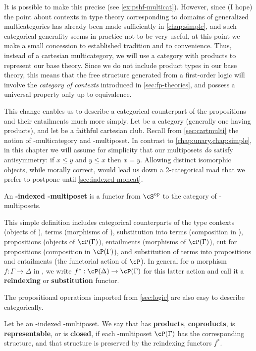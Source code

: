 It is possible to make this precise (see \cref{ex:pshf-multicat}).
However, since (I hope) the point about contexts in type theory corresponding to domains of generalized multicategories has already been made sufficiently in \cref{chap:simple}, and such categorical generality seems in practice not to be very useful, at this point we make a small concession to established tradition and to convenience.
Thus, instead of a cartesian multicategory, we will use a category with products to represent our base theory.
Since we do not include product types in our base theory, this means that the free structure generated from a first-order logic will involve the \emph{category of contexts} introduced in \cref{sec:fp-theories}, and possess a universal property only up to equivalence.

This change enables us to describe a categorical counterpart of the propositions and their entailments much more simply.
Let \cS be a category (generally one having products), and let \fS be a faithful cartesian club.
Recall from \cref{sec:cartmulti} the notion of \fS-multicategory and \fS-multiposet.
In contrast to \cref{chap:unary,chap:simple}, in this chapter we will assume for simplicity that our multiposets \emph{do} satisfy antisymmetry: if $x\le y$ and $y\le x$ then $x=y$.
Allowing distinct isomorphic objects, while morally correct, would lead us down a 2-categorical road that we prefer to postpone until \cref{sec:indexed-moncat}.

\begin{defn}
  An \textbf{\cS-indexed \fS-multiposet} is a functor \cP from $\cS\op$ to the category of \fS-multiposets.
\end{defn}

This simple definition includes categorical counterparts of the type contexts (objects of \cS), terms (morphisms of \cS), substitution into terms (composition in \cS), propositions (objects of $\cP(\Gamma)$), entailments (morphisms of $\cP(\Gamma)$), cut for propositions (composition in $\cP(\Gamma)$), and substitution of terms into propositions and entailments (the functorial action of $\cP$).
In general for a morphism $f:\Gamma\to\Delta$ in \cS, we write $f^* : \cP(\Delta) \to \cP(\Gamma)$ for this latter action and call it a \textbf{reindexing} or \textbf{substitution} functor.

The propositional operations imported from \cref{sec:logic} are also easy to describe categorically.

\begin{defn}
  Let \cP be an \cS-indexed \fS-multiposet.
  We say that \cP has \textbf{products}, \textbf{coproducts}, is \textbf{representable}, or is \textbf{closed}, if each \fS-multiposet $\cP(\Gamma)$ has the corresponding structure, and that structure is preserved by the reindexing functors $f^*$.
\end{defn}

